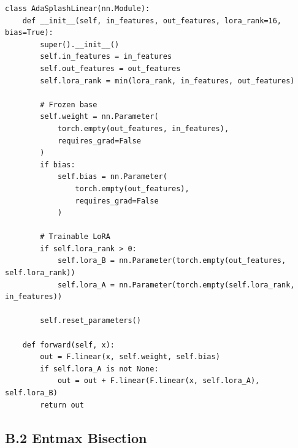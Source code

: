 \begin{lstlisting}
class AdaSplashLinear(nn.Module):
    def __init__(self, in_features, out_features, lora_rank=16, bias=True):
        super().__init__()
        self.in_features = in_features
        self.out_features = out_features
        self.lora_rank = min(lora_rank, in_features, out_features)
        
        # Frozen base
        self.weight = nn.Parameter(
            torch.empty(out_features, in_features),
            requires_grad=False
        )
        if bias:
            self.bias = nn.Parameter(
                torch.empty(out_features),
                requires_grad=False
            )
        
        # Trainable LoRA
        if self.lora_rank > 0:
            self.lora_B = nn.Parameter(torch.empty(out_features, self.lora_rank))
            self.lora_A = nn.Parameter(torch.empty(self.lora_rank, in_features))
        
        self.reset_parameters()
    
    def forward(self, x):
        out = F.linear(x, self.weight, self.bias)
        if self.lora_A is not None:
            out = out + F.linear(F.linear(x, self.lora_A), self.lora_B)
        return out
\end{lstlisting}

\subsection{B.2 Entmax Bisection}

